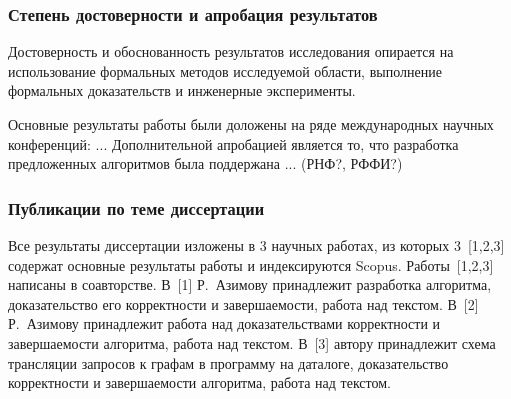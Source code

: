 

\subsubsection*{\large{Степень достоверности и апробация результатов}}
Достоверность и обоснованность результатов исследования опирается на использование формальных методов исследуемой области, выполнение формальных доказательств и инженерные эксперименты.

Основные результаты работы были доложены на ряде международных научных конференций: ... Дополнительной апробацией является то, что разработка предложенных алгоритмов была поддержана ... (РНФ?, РФФИ?)

\subsubsection*{\large{Публикации по теме диссертации}}
 Все результаты диссертации изложены в 3 научных работах, из которых 3~[1,2,3] содержат основные результаты работы и индексируются Scopus. Работы~[1,2,3] написаны в соавторстве. В~[1] Р.~Азимову принадлежит разработка алгоритма, доказательство его корректности и завершаемости, работа над текстом. В~[2] Р.~Азимову принадлежит работа над доказательствами корректности и завершаемости алгоритма, работа над текстом. В~[3] автору принадлежит схема трансляции запросов к графам в программу на даталоге, доказательство корректности и завершаемости алгоритма, работа над текстом.







